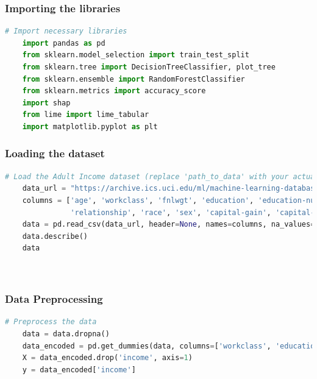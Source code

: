 \documentclass[10pt,journal,compsoc]{IEEEtran}
\begin{document}
\subsubsection{Importing the libraries}

\begin{lstlisting}[language=Python, caption={Import libraries}, label=python_code, captionpos=b,  basicstyle=\scriptsize]
    # Import necessary libraries
    import pandas as pd
    from sklearn.model_selection import train_test_split
    from sklearn.tree import DecisionTreeClassifier, plot_tree
    from sklearn.ensemble import RandomForestClassifier
    from sklearn.metrics import accuracy_score
    import shap
    from lime import lime_tabular
    import matplotlib.pyplot as plt
\end{lstlisting}

\subsubsection{Loading the dataset}
\begin{lstlisting}[language=Python, caption={Load dataset}, label=python_code, captionpos=b,  basicstyle=\scriptsize]
    # Load the Adult Income dataset (replace 'path_to_data' with your actual path)
    data_url = "https://archive.ics.uci.edu/ml/machine-learning-databases/adult/adult.data"
    columns = ['age', 'workclass', 'fnlwgt', 'education', 'education-num', 'marital-status', 'occupation',
               'relationship', 'race', 'sex', 'capital-gain', 'capital-loss', 'hours-per-week', 'native-country', 'income']
    data = pd.read_csv(data_url, header=None, names=columns, na_values=' ?', skipinitialspace=True)
    data.describe()
    data
  
    
\end{lstlisting}

\subsubsection{Data Preprocessing}

\begin{lstlisting}[language=Python, caption={Data Preprocessing}, label=python_code, captionpos=b,  basicstyle=\scriptsize]
    # Preprocess the data
    data = data.dropna()
    data_encoded = pd.get_dummies(data, columns=['workclass', 'education', 'marital-status', 'occupation', 'relationship', 'race', 'sex', 'native-country'])
    X = data_encoded.drop('income', axis=1)
    y = data_encoded['income']
\end{lstlisting}
\end{document}
